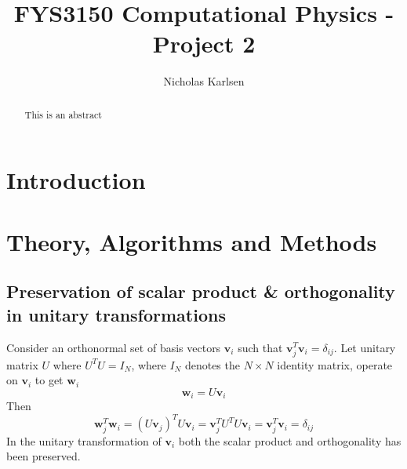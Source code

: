 \documentclass[10pt,showpacs,preprintnumbers,footinbib,amsmath,amssymb,aps,prl,twocolumn,groupedaddress,superscriptaddress,showkeys]{revtex4-1}
\begin{document}
\title{FYS3150 Computational Physics - Project 2}
\author{Nicholas Karlsen}

\begin{abstract}
  This is an abstract
\end{abstract}

\maketitle

\section{Introduction}
\section{Theory, Algorithms and Methods}
  \subsection{Preservation of scalar product \& orthogonality in unitary transformations\label{subsec:preservation}}
    Consider an orthonormal set of basis vectors $\mathbf v_i$ such that $\mathbf v_j^T \mathbf v_i = \delta_{ij}$. Let unitary matrix $U$ where $U^T U= I_N$, where $I_N$ denotes the $N\times N$ identity matrix, operate on $\mathbf v_i$ to get $\mathbf w_i$
    \begin{equation}
      \mathbf w_i = U \mathbf v_i
    \end{equation}
    Then
    \begin{equation}
      \mathbf w_j^T\mathbf w_i = (U\mathbf v_j)^TU\mathbf v_i = \mathbf v_j^T U^T U \mathbf v_i
      = \mathbf v_j^T \mathbf v_i = \delta_{ij}
    \end{equation}
    In the unitary transformation of $\mathbf v_i$ both the scalar product and orthogonality has been preserved.
\end{document}
